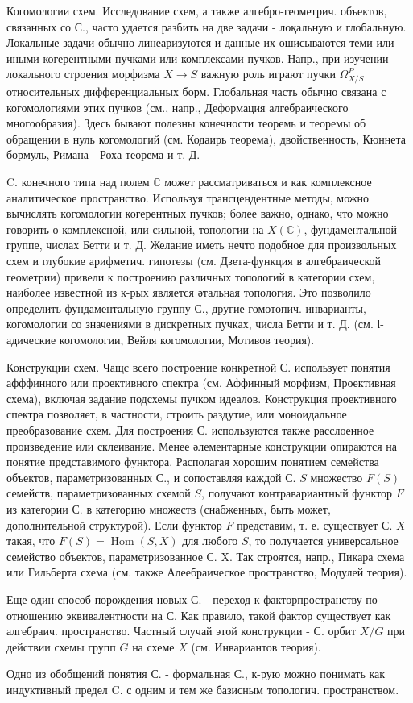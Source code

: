 \documentclass[10pt]{article}
\begin{document}
Когомологии схем. Исследование схем, а также алгебро-геометрич. объектов, связанных со С., часто удается разбить на две задачи - лоқальную и глобальную. Локальные задачи обычно линеаризуются и данные их ошисываются теми или иными когерентными пучками или комплексами пучков. Напр., при изучении локального строения морфизма $X \rightarrow S$ важную роль играют пучки $\Omega_{X / S}^{P}$ относительных дифференциальных борм. Глобальная часть обычно связана с когомологиями этих пучков (см., напр., Деформация алгебраического многообразия). Здесь бывают полезны конечности теоремь и теоремы об обращении в нуль когомологий (см. Кодаирь теорема), двойственность, Кюннета бормуль, Римана - Роха теорема и т. Д.



C. конечного типа над полем $\mathbb{C}$ может рассматриваться и как комплексное аналитическое пространство. Используя трансцендентные методы, можно вычислять когомологии когерентных пучков; более важно, однако, что можно говорить о комплексной, или сильной, топологии на $X(\mathbb{C})$, фундаментальной группе, числах Бетти и т. Д. Желание иметь нечто подобное для произвольных схем и глубокие арифметич. гипотезы (см. Дзета-функция в алгебраической геометрии) привели к построению различных топологий в категории схем, наиболее известной из к-рых является әтальная топология. Это позволило определить фундаментальную группу С., другие гомотопич. инварианты, когомологии со значениями в дискретных пучках, числа Бетти и т. Д. (см. l-адические когомологии, Вейля когомологии, Мотивов теория).



Конструкции схем. Чащс всего построение конкретной С. использует понятия афффинного или проективного спектра (см. Аффинный морфизм, Проективная схема), включая задание подсхемы пучком идеалов. Конструкция проективного спектра позволяет, в частности, строить раздутие, или моноидальное преобразование схем. Для построения С. используются также расслоенное произведение или склеивание. Менее әлементарные конструкции опираются на понятие представимого функтора. Располагая хорошим понятием семейства объектов, параметризованных С., и сопоставляя каждой С. $S$ множество $F(S)$ семейств, параметризованных схемой $S$, получают контравариантный функтор $F$ из категории С. в категорию множеств (снабженных, быть может, дополнительной структурой). Если функтор $F$ представим, т. е. существует С. $X$ такая, что $F(S)=\operatorname{Hom}(S, X)$ для любого $S$, то получается универсальное семейство объектов, параметризованное С. X. Так строятся, напр., Пикара схема или Гильберта схема (см. также Алеебраическое пространство, Модулей теория).



Еще один способ порождения новых С. - переход к факторпространству по отношению эквивалентности на С. Как правило, такой фактор существует как алгебраич. пространство. Частный случай этой конструкции - С. орбит $X / G$ при действии схемы групп $G$ на схеме $X$ (см. Инвариантов теория).



Одно из обобщений понятия С. - формальная С., к-рую можно понимать как индуктивный предел $\mathrm{C}$. с одним и тем же базисным топологич. пространством.
\end{document}

